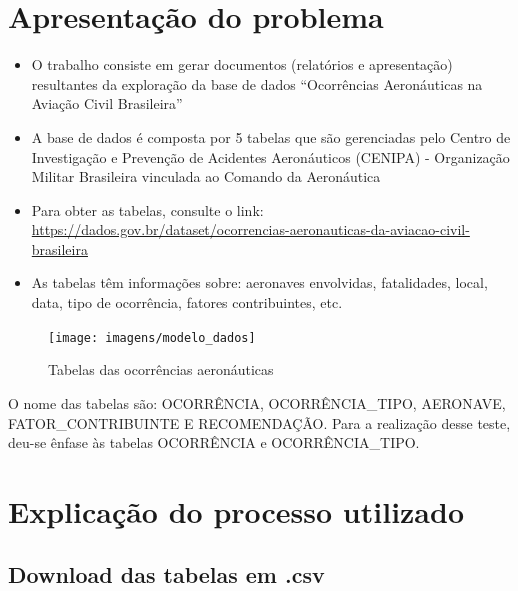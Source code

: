 \documentclass[
]{article}
\begin{document}
\hypertarget{apresentauxe7uxe3o-do-problema}{%
\section{Apresentação do
problema}\label{apresentauxe7uxe3o-do-problema}}

\begin{itemize}
\item
  O trabalho consiste em gerar documentos (relatórios e apresentação)
  resultantes da exploração da base de dados ``Ocorrências Aeronáuticas
  na Aviação Civil Brasileira''
\item
  A base de dados é composta por 5 tabelas que são gerenciadas pelo
  Centro de Investigação e Prevenção de Acidentes Aeronáuticos (CENIPA)
  - Organização Militar Brasileira vinculada ao Comando da Aeronáutica
\item
  Para obter as tabelas, consulte o link:
  \url{https://dados.gov.br/dataset/ocorrencias-aeronauticas-da-aviacao-civil-brasileira}
\item
  As tabelas têm informações sobre: aeronaves envolvidas, fatalidades,
  local, data, tipo de ocorrência, fatores contribuintes, etc.
\end{itemize}

\begin{figure}

{\centering \texttt{[image: imagens/modelo\_dados]} 

}

\caption{Tabelas das ocorrências aeronáuticas}\label{fig:unnamed-chunk-2}
\end{figure}

O nome das tabelas são: OCORRÊNCIA, OCORRÊNCIA\_TIPO, AERONAVE,
FATOR\_CONTRIBUINTE E RECOMENDAÇÃO. Para a realização desse teste,
deu-se ênfase às tabelas OCORRÊNCIA e OCORRÊNCIA\_TIPO.

\newpage

\hypertarget{explicauxe7uxe3o-do-processo-utilizado}{%
\section{Explicação do processo
utilizado}\label{explicauxe7uxe3o-do-processo-utilizado}}

\hypertarget{download-das-tabelas-em-.csv}{%
\subsection{Download das tabelas em
.csv}\label{download-das-tabelas-em-.csv}}
\end{document}
